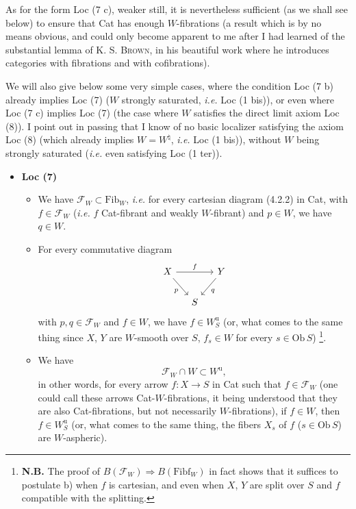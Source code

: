 \documentclass[11pt]{article}
\newcommand{\msp}[1]{\marginpar{\footnotesize [#1]}}
\newcommand{\Fib}{\mathrm{Fib}}
\newcommand{\Fibf}{\mathrm{Fibf}}
\begin{document}
As for the form Loc (7 c), weaker still, it is nevertheless sufficient (as we shall see below) to ensure that Cat has enough $W$-fibrations \msp{page 38} (a result which is by no means obvious, and could only become apparent to me after I had learned of the substantial lemma of K. S. \textsc{Brown}, in his beautiful work where he introduces categories with fibrations and with cofibrations).

We will also give below some very simple cases, where the condition Loc (7 b) already implies Loc (7) ($W$ strongly saturated, \textit{i.e.} Loc (1 bis)), or even where Loc (7 c) implies Loc (7) (the case where $W$ satisfies the direct limit axiom Loc (8)). I point out in passing that I know of no basic localizer satisfying the axiom Loc (8) (which already implies $W = W^{\natural}$, \textit{i.e.} Loc (1 bis)), without $W$ being strongly saturated (\textit{i.e.} even satisfying Loc (1 ter)).

\begin{itemize}[label={},leftmargin=0.6cm]
\item \textbf{Loc (7)}
\begin{itemize}[leftmargin=1.2cm]
\item[a)] We have $\mathcal{F}_W \subset \Fib_W$, \textit{i.e.} for every cartesian diagram (4.2.2) in Cat, with $f \in \mathcal{F}_W$ (\textit{i.e.} $f$ Cat-fibrant and weakly $W$-fibrant) and $p \in W$, we have $q \in W$.
\item[b)] For every commutative diagram
\[
\begin{tikzcd}[column sep=small]
X \arrow[rr, "f"] \arrow[dr, "p"'] & & Y \arrow[dl, "q"] \\
 & S &
\end{tikzcd}
\]
\msp{page 39}
with $p, q \in \mathcal{F}_W$ and $f \in W$, we have $f \in W_S^{\mathrm{u}}$ (or, what comes to the same thing since $X$, $Y$ are $W$-smooth over $S$, $f_s \in W$ for every $s \in \mathrm{Ob}\, S$) \footnote[25]{\textbf{N.B.} The proof of $B(\mathcal{F}_W) \Longrightarrow B(\Fibf_W)$ in fact shows that it suffices to postulate b) when $f$ is cartesian, and even when $X$, $Y$ are split over $S$ and $f$ compatible with the splitting.}.
\item[c)] We have
\[
\mathcal{F}_W \cap W \subset W^{\mathrm{u}},
\]
in other words, for every arrow $f : X \longrightarrow S$ in Cat such that $f \in \mathcal{F}_W$ (one could call these arrows Cat-$W$-fibrations, it being understood that they are also Cat-fibrations, but not necessarily $W$-fibrations), if $f \in W$, then $f \in W_S^{\mathrm{u}}$ (or, what comes to the same thing, the fibers $X_s$ of $f$ ($s \in \mathrm{Ob}\, S$) are $W$-aspheric).
\end{itemize}
\end{itemize}
\end{document}
